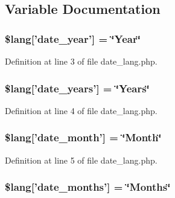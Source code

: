 \subsection{Variable Documentation}
\hypertarget{date__lang_8php_ad344b819f5b881c0e2d75c994b8781b7}{
\subsubsection[{\$lang}]{\setlength{\rightskip}{0pt plus 5cm}\$lang\mbox{[}'date\-\_\-year'\mbox{]} = \char`\"{}Year\char`\"{}}}\label{date__lang_8php_ad344b819f5b881c0e2d75c994b8781b7}


Definition at line 3 of file date\-\_\-lang.\-php.

\hypertarget{date__lang_8php_ad553cabe66c6e6feff320f69fadfc561}{
\subsubsection[{\$lang}]{\setlength{\rightskip}{0pt plus 5cm}\$lang\mbox{[}'date\-\_\-years'\mbox{]} = \char`\"{}Years\char`\"{}}}\label{date__lang_8php_ad553cabe66c6e6feff320f69fadfc561}


Definition at line 4 of file date\-\_\-lang.\-php.

\hypertarget{date__lang_8php_a27b6a453e0ff873f09050b0882b86b43}{
\subsubsection[{\$lang}]{\setlength{\rightskip}{0pt plus 5cm}\$lang\mbox{[}'date\-\_\-month'\mbox{]} = \char`\"{}Month\char`\"{}}}\label{date__lang_8php_a27b6a453e0ff873f09050b0882b86b43}


Definition at line 5 of file date\-\_\-lang.\-php.

\hypertarget{date__lang_8php_af22d57f979004523c31e7252891b8ce1}{
\subsubsection[{\$lang}]{\setlength{\rightskip}{0pt plus 5cm}\$lang\mbox{[}'date\-\_\-months'\mbox{]} = \char`\"{}Months\char`\"{}}}\label{date__lang_8php_af22d57f979004523c31e7252891b8ce1}


